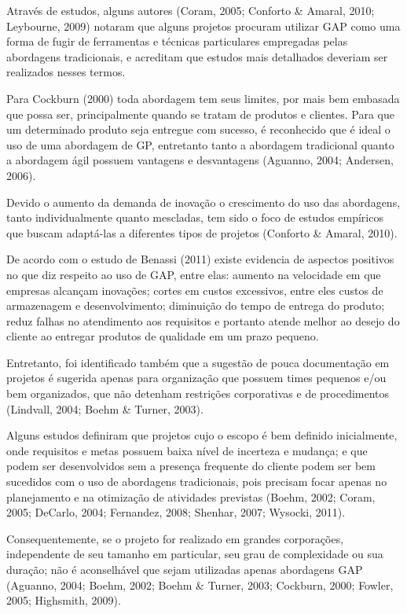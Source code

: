 Através de estudos, alguns autores (Coram, 2005; Conforto \& Amaral, 2010; Leybourne, 2009) notaram que alguns projetos procuram utilizar GAP como uma forma de fugir de ferramentas e técnicas particulares empregadas pelas abordagens tradicionais, e acreditam que estudos mais detalhados deveriam ser realizados nesses termos.

Para Cockburn (2000) toda abordagem tem seus limites, por mais bem embasada que possa ser, principalmente quando se tratam de produtos e clientes. Para que um determinado produto seja entregue com sucesso, é reconhecido que é ideal o uso de uma abordagem de GP, entretanto tanto a abordagem tradicional quanto a abordagem ágil possuem vantagens e desvantagens (Aguanno, 2004; Andersen, 2006).

Devido o aumento da demanda de inovação o crescimento do uso das abordagens, tanto individualmente quanto mescladas, tem sido o foco de estudos empíricos que buscam adaptá-las a diferentes tipos de projetos (Conforto \& Amaral, 2010).

De acordo com o estudo de Benassi (2011) existe evidencia de aspectos positivos no que diz respeito ao uso de GAP, entre elas: aumento na velocidade em que empresas alcançam inovações; cortes em custos excessivos, entre eles custos de armazenagem e desenvolvimento; diminuição do tempo de entrega do produto; reduz falhas no atendimento aos requisitos e portanto atende melhor ao desejo do cliente ao entregar produtos de qualidade em um prazo pequeno.

Entretanto, foi identificado também que a sugestão de pouca documentação em projetos é sugerida apenas para organização que possuem times pequenos e/ou bem organizados, que não detenham restrições corporativas e de procedimentos (Lindvall, 2004; Boehm \& Turner, 2003).

Alguns estudos definiram que projetos cujo o escopo é bem definido inicialmente, onde requisitos e metas possuem baixa nível de incerteza e mudança; e que podem ser desenvolvidos sem a presença frequente do cliente podem ser bem sucedidos com o uso de abordagens tradicionais, pois precisam focar apenas no planejamento e na otimização de atividades previstas (Boehm, 2002; Coram, 2005; DeCarlo, 2004; Fernandez, 2008; Shenhar, 2007; Wysocki, 2011).

Consequentemente, se o projeto for realizado em grandes corporações, independente de seu tamanho em particular, seu grau de complexidade ou sua duração; não é aconselhável que sejam utilizadas apenas abordagens GAP (Aguanno, 2004; Boehm, 2002; Boehm \& Turner, 2003; Cockburn, 2000; Fowler, 2005; Highsmith, 2009).

